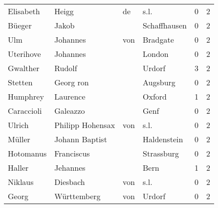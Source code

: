 \documentclass[10pt,a4paper,landscape]{article}
\begin{document}
\begin{longtable}{llllrr}
                Elisabeth &                              Heigg &          de &                                        s.l. &          0 &         2 \\
                   Büeger &                              Jakob &             &                                Schaffhausen &          0 &         2 \\
                      Ulm &                           Johannes &         von &                                    Bradgate &          0 &         2 \\
                Uterihove &                           Johannes &             &                                      London &          0 &         2 \\
                 Gwalther &                             Rudolf &             &                                      Urdorf &          3 &         2 \\
                  Stetten &                          Georg ron &             &                                    Augsburg &          0 &         2 \\
                 Humphrey &                           Laurence &             &                                      Oxford &          1 &         2 \\
               Caraccioli &                           Galeazzo &             &                                        Genf &          0 &         2 \\
                   Ulrich &                  Philipp  Hohensax &         von &                                        s.l. &          0 &         2 \\
                   Müller &                     Johann Baptist &             &                                 Haldenstein &          0 &         2 \\
                Hotomanus &                         Franciscus &             &                                  Strassburg &          0 &         2 \\
                   Haller &                           Jehannes &             &                                        Bern &          1 &         2 \\
                  Niklaus &                           Diesbach &         von &                                        s.l. &          0 &         2 \\
                    Georg &                        Württemberg &         von &                                      Urdorf &          0 &         2 \\

\end{longtable}
\end{document}
